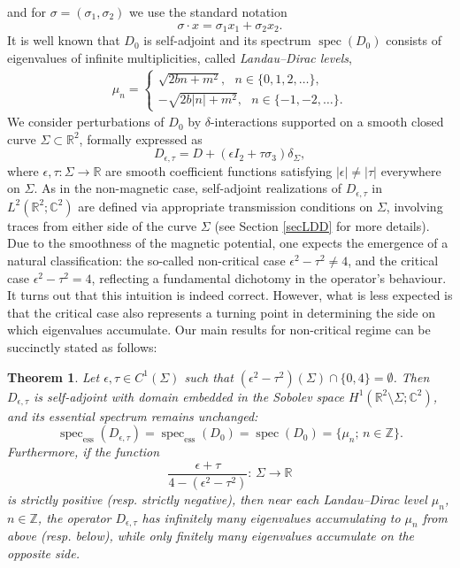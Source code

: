 \documentclass[11pt,a4paper,reqno,oneside]{amsproc}
\DeclareMathOperator{\spec}{spec}
\newcommand{\spece}{\spec_\mathrm{ess}}
\def \rr {{\mathbb R}}
\def \cc {{\mathbb C}}
\def \zz {{\mathbb Z}}
\numberwithin{equation}{section}
\def \cc {{\mathbb{C}}}
\newtheorem{theorem}[definition]{Theorem}
\begin{document}
and for $\sigma=(\sigma_1,\sigma_2)$ we use the standard notation
\[
\sigma\cdot x=\sigma_1 x_1 +\sigma_2 x_2.
\]
It is well known \cite[Theorem 7.2]{Thaller92} that $D_0$ is self-adjoint and its spectrum $\spec(D_0)$ consists of eigenvalues of infinite multiplicities, called \textit{Landau--Dirac levels},
\begin{align*}
    \mu_n= \begin{cases}
    \sqrt{2bn+m^2}, \,\,\,\, n\in\{0,1,2,\dots\},\\
    -\sqrt{2b|n|+m^2}, \,\, \,\,  n\in\{-1, -2,\dots\}.
\end{cases}
\end{align*}
We consider perturbations of $D_0$ by $\delta$-interactions supported on a smooth  closed curve $\Sigma\subset\rr^2$,  formally expressed as 
	\[
	D_{\epsilon, \tau}= D+ (\epsilon I_2 + \tau \sigma_3)\delta_\Sigma, 
	\]
 where  $\epsilon,\tau: \Sigma\to \rr$ are smooth coefficient functions satisfying $|\epsilon| \neq |\tau|$ everywhere on $\Sigma$.   As in the non-magnetic case, self-adjoint realizations of  $D_{\epsilon, \tau}$ in $L^2(\rr^2;\cc^2)$ are defined via appropriate transmission conditions on $\Sigma$, involving traces from either side of the curve $\Sigma$ (see Section \ref{secLDD} for more details). Due to the smoothness of the magnetic potential,  one expects the emergence of a natural classification:   the so-called non-critical case $\epsilon^2-\tau^2\neq 4$, and the critical case $\epsilon^2-\tau^2 = 4$, reflecting a fundamental dichotomy in the operator's behaviour.  It turns out that this intuition is indeed correct.  However, what is less expected is that the critical case also represents a turning point in determining the side on which eigenvalues accumulate.
Our main results for non-critical regime can be succinctly stated as follows:
 \begin{theorem}\label{main_Th0}
Let $\epsilon,\tau\in C^1(\Sigma)$ such that $(\epsilon^2-\tau^2)(\Sigma) \cap \{0,4\} = \emptyset$. Then $D_{\epsilon,\tau} $ is self-adjoint with domain embedded in the Sobolev space $ H^1(\rr^2\setminus\Sigma;\cc^2)$, and its essential spectrum remains unchanged: 
\[\spece (D_{\epsilon,\tau})=\spece (D_0)=\spec (D_0) = \{ \mu_n; \, n \in  \zz \}.\]
Furthermore, if the function
\[
\frac{\epsilon + \tau}{4 - (\epsilon^2-\tau^2)}: \,\Sigma\rightarrow \rr
\]
is strictly positive (resp. strictly negative), then near each Landau--Dirac level $\mu_n$, $ n \in \zz$, the operator $D_{\epsilon,\tau}$ has infinitely many eigenvalues accumulating to $\mu_n$ from above (resp. below), while only finitely many eigenvalues accumulate on the opposite side. 	
\end{theorem}
\end{document}
